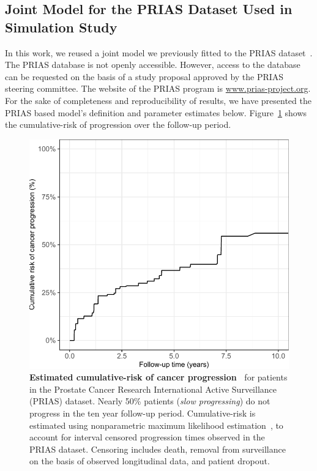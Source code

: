 \begin{subappendices}
\section{Joint Model for the PRIAS Dataset Used in Simulation Study}
In this work, we reused a joint model we previously fitted to the PRIAS dataset~\citep{tomer2019personalized,tomer2020webapp}. The PRIAS database is not openly accessible. However, access to the database can be requested on the basis of a study proposal approved by the PRIAS steering committee. The website of the PRIAS program is \url{www.prias-project.org}. For the sake of completeness and reproducibility of results, we have presented the PRIAS based model's definition and parameter estimates below. Figure~\ref{c4:fig:app1} shows the cumulative-risk of progression over the follow-up period.

\begin{figure}
\centerline{\includegraphics{contents/c4/images/c4_fig_app1.pdf}}
\caption{\textbf{Estimated cumulative-risk of cancer progression~\citep{tomer2020webapp}} for patients in the Prostate Cancer Research International Active Surveillance (PRIAS) dataset. Nearly 50\% patients (\emph{slow progressing}) do not progress in the ten year follow-up period. Cumulative-risk is estimated using nonparametric maximum likelihood estimation~\citep{turnbull1976empirical}, to account for interval censored progression times observed in the PRIAS dataset. Censoring includes death, removal from surveillance on the basis of observed longitudinal data, and patient dropout.}
\label{c4:fig:app1}
\end{figure}


\end{subappendices}
